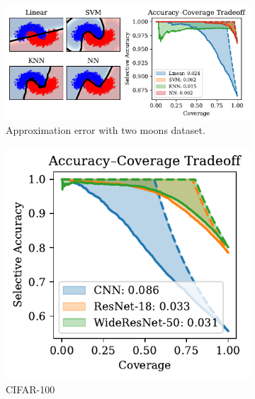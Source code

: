 \begin{figure}[t]
  \centering
  \begin{subfigure}[t]{0.49\textwidth}
  \centering
    \includegraphics[width=\linewidth]{figs/sc_bounds/2moons_models.pdf}%
    \caption{Approximation error with two moons dataset.}
    \label{fig:left}
  \end{subfigure}
  \begin{subfigure}[t]{0.24\textwidth}
    \centering
    \includegraphics[width=\linewidth]{figs/sc_bounds/cifar100_arch_tradeoffs.pdf} 
    \caption{CIFAR-100}
    \label{fig:right}
  \end{subfigure}
  \begin{subfigure}[t]{0.24\textwidth}
    \centering

\end{subfigure}
\end{figure}
